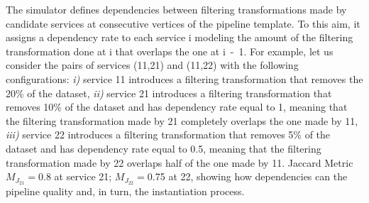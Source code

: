 The simulator defines dependencies between filtering transformations made by candidate services at consecutive vertices of the pipeline template.
To this aim, it assigns a dependency rate to each service \si{i} modeling the amount of the filtering transformation done at \si{i} that overlaps the one at \si{i-1}.
For example, let us consider the pairs of services (\si{11},\si{21}) and (\si{11},\si{22}) with the following configurations: \emph{i)} service \si{11} introduces a filtering transformation that removes the 20\% of the dataset, \emph{ii)} service \si{21} introduces a filtering transformation that removes 10\% of the dataset and has dependency rate equal to 1, meaning that the filtering transformation made by \si{21} completely overlaps the one made by \si{11}, \emph{iii)} service \si{22} introduces a filtering transformation that removes 5\% of the dataset and has dependency rate equal to 0.5, meaning that the filtering transformation made by \si{22} overlaps half of the one made by \si{11}. Jaccard Metric $M_{J_{21}}$$=$0.8 at service \si{21}; $M_{J_{22}}$$=$0.75 at \si{22}, showing how dependencies can the pipeline quality and, in turn, the instantiation process.

